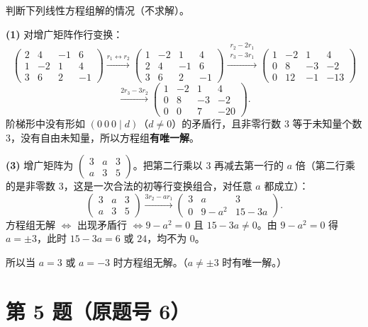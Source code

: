 \documentclass[11pt,a4paper]{ctexart}
\newcommand{\rt}[1]{\xrightarrow{#1}}
\newenvironment{problem}[1]
  {\par\medskip\noindent\textbf{#1}\quad}
  {\par}
\begin{document}
\begin{problem}{}判断下列线性方程组解的情况（不求解）。\end{problem}

\textbf{(1)} 对增广矩阵作行变换：
\[
\left(\begin{array}{ccc|c}2&4&-1&6\\1&-2&1&4\\3&6&2&-1\end{array}\right)
\rt{r_1\leftrightarrow r_2}
\left(\begin{array}{ccc|c}1&-2&1&4\\2&4&-1&6\\3&6&2&-1\end{array}\right)
\rt{\substack{r_2-2r_1\\ r_3-3r_1}}
\left(\begin{array}{ccc|c}1&-2&1&4\\0&8&-3&-2\\0&12&-1&-13\end{array}\right)
\]
\[
\rt{2r_3-3r_2}
\left(\begin{array}{ccc|c}1&-2&1&4\\0&8&-3&-2\\0&0&7&-20\end{array}\right).
\]
阶梯形中没有形如 $(0\ 0\ 0\mid d)$（$d\ne0$）的矛盾行，且非零行数 $3$ 等于未知量个数 $3$，没有自由未知量，所以方程组\textbf{有唯一解}。

\textbf{(3)} 增广矩阵为 $\left(\begin{array}{cc|c}3&a&3\\a&3&5\end{array}\right)$。把第二行乘以 $3$ 再减去第一行的 $a$ 倍（第二行乘的是非零数 $3$，这是一次合法的初等行变换组合，对任意 $a$ 都成立）：
\[
\left(\begin{array}{cc|c}3&a&3\\a&3&5\end{array}\right)
\rt{3r_2-ar_1}
\left(\begin{array}{cc|c}3&a&3\\0&9-a^2&15-3a\end{array}\right).
\]
方程组无解 $\iff$ 出现矛盾行 $\iff 9-a^2=0$ 且 $15-3a\ne0$。由 $9-a^2=0$ 得 $a=\pm3$，此时 $15-3a=6$ 或 $24$，均不为 $0$。

所以当 $a=3$ 或 $a=-3$ 时方程组无解。（$a\ne\pm3$ 时有唯一解。）

\section*{第 5 题（原题号 6）}
\end{document}
